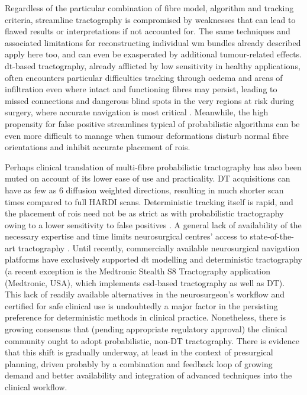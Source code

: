Regardless of the particular combination of fibre model, algorithm and tracking criteria, streamline tractography is compromised by weaknesses that can lead to flawed results or interpretations if not accounted for\autocite{Rheault2020, Schilling2022, Schilling2019}.
The same techniques and associated limitations for reconstructing individual \gls{wm} bundles already described apply here too, and can even be exasperated by additional tumour-related effects.
\gls{dt}-based tractography, already afflicted by low sensitivity in healthy applications, often encounters particular difficulties tracking through oedema and areas of infiltration even where intact and functioning fibres may persist\autocite{Leclercq2010}, leading to missed connections and dangerous blind spots in the very regions at risk during surgery, where accurate navigation is most critical \autocite{Kuhnt2013,Ashmore2020}.
Meanwhile, the high propensity for false positive streamlines typical of probabilistic algorithms can be even more difficult to manage when tumour deformations disturb normal fibre orientations and inhibit accurate placement of \glspl{roi}\autocite{Yang2021}.

Perhaps clinical translation of multi-fibre probabilistic tractography has also been muted on account of its lower ease of use and practicality.
DT acquisitions can have as few as 6 diffusion weighted directions, resulting in much shorter scan times compared to full HARDI scans.
Deterministic tracking itself is rapid, and the placement of \glspl{roi} need not be as strict as with probabilistic tractography owing to a lower sensitivity to false positives \autocite{ODonnell2017}.
A general lack of availability of the necessary expertise and time limits neurosurgical centres' access to state-of-the-art tractography \autocite{Toescu2020}.
Until recently, commercially available neurosurgical navigation platforms have exclusively supported \gls{dt} modelling and deterministic tractography (a recent exception is the Medtronic Stealth\texttrademark{} S8 Tractography application (Medtronic, USA), which implements \gls{csd}-based tractography\autocite{Pozzilli2023} as well as DT).
This lack of readily available alternatives in the neurosurgeon's workflow and certified for safe clinical use is undoubtedly a major factor in the persisting preference for deterministic methods in clinical practice.
Nonetheless, there is growing consensus that (pending appropriate regulatory approval) the clinical community ought to adopt probabilistic, non-DT tractography\autocite{Yang2021, Beare2022, Petersen2017}.
There is evidence that this shift is gradually underway, at least in the context of presurgical planning\autocite{Toescu2020}, driven probably by a combination and feedback loop of growing demand and better availability and integration of advanced techniques into the clinical workflow.

